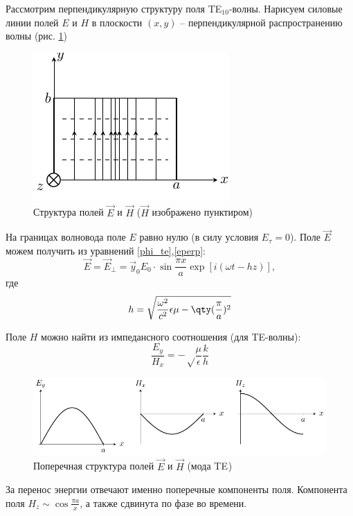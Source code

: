 Рассмотрим перпендикулярную структуру поля TE$_{10}$-волны. Нарисуем силовые линии полей $E$ и $H$ в плоскости $(x,y)$ -- перпендикулярной распространению волны (рис. \ref{fig:lect4:8})
\begin{figure}[h!]
	\centering
	\includegraphics[scale=1.5]{img/lect4_ris8}
	\caption{Структура полей $\vec{E}$ и $\vec{H}$ ($\vec{H}$ изображено пунктиром)}
	\label{fig:lect4:8}
\end{figure}

На границах волновода поле $E$ равно нулю (в силу условия $E_\tau=0$). Поле $\vec{E}$ можем получить из уравнений \eqref{phi_te},\eqref{eperp}:
\begin{equation}
	\vec{E}=\vec{E}_\perp=\vec{y}_0E_0\cdot\sin\frac{\pi x}{a}\exp[i(\omega t - hz)],
\end{equation}
где 
\begin{equation}
	h=\sqrt{
		\frac{\omega^2}{c^2}\epsilon \mu - \qty(\frac{\pi}{a})^2
	}
\end{equation}

Поле $H$ можно найти из импедансного соотношения (для TE-волны):
\begin{equation}
	\frac{E_y}{H_x}=-\sqrt\frac{\mu}{\epsilon}\frac{k}{h}
\end{equation}

\begin{figure}[h!]
	\centering
	\includegraphics[width=\textwidth]{img/lect4_ris9}
	\caption{Поперечная структура полей $\vec{E}$ и $\vec{H}$ (мода TE$_{}$)}
	\label{fig:lect4:9}
\end{figure}

За перенос энергии отвечают именно поперечные компоненты поля. Компонента поля
$H_z \sim \cos\frac{\pi a}{x}$, а также сдвинута по фазе во времени. 


